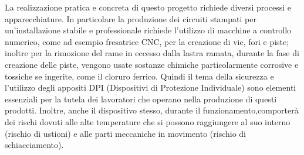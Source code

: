 \documentclass[12pt]{article}
\begin{document}
    \vspace{1cm}
    La realizzazione pratica e concreta di questo progetto richiede diversi processi e apparecchiature. In particolare la produzione dei circuiti stampati per un'installazione stabile e professionale richiede l'utilizzo di macchine a controllo numerico, come ad esempio fresatrice CNC, per la creazione di vie, fori e piste; inoltre per la rimozione del rame in eccesso dalla lastra ramata, durante la fase di creazione delle piste, vengono usate sostanze chimiche particolarmente corrosive e tossiche se ingerite, come il cloruro ferrico. Quindi il tema della sicurezza e l'utilizzo degli appositi DPI (Dispositivi di Protezione Individuale) sono elementi essenziali per la tutela dei lavoratori che operano nella produzione di questi prodotti. Inoltre, anche il dispositivo stesso, durante il funzionamento,comporterà dei rischi dovuti alle alte temperature che si possono raggiungere al suo interno (rischio di ustioni) e alle parti meccaniche in movimento (rischio di schiacciamento).
    
    \vfill
    \let\thefootnote\relax{}
\end{document}
